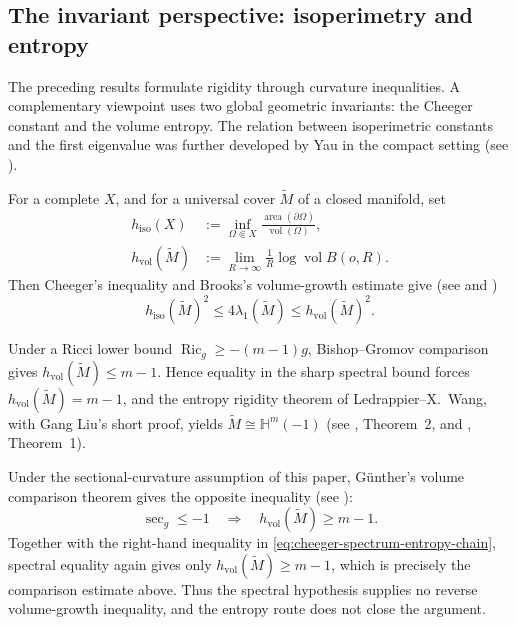 \documentclass[12pt]{amsart}
\theoremstyle{definition}
\numberwithin{equation}{section}
\newcommand{\wti}{\widetilde}
\newcommand{\bH}{\mathbb{H}}
\newcommand{\vol}{\operatorname{vol}}
\newcommand{\area}{\operatorname{area}}
\DeclareMathOperator{\Ric}{Ric}
\begin{document}
\subsection*{The invariant perspective: isoperimetry and entropy}

The preceding results formulate rigidity through curvature inequalities.
A complementary viewpoint uses two global geometric invariants: the
Cheeger constant and the volume entropy.
The relation between isoperimetric constants and the first eigenvalue was
further developed by Yau in the compact setting
(see \cite{Yau1975Isoperimetric}).

For a complete \(X\), and for a universal cover \(\wti M\) of a closed
manifold, set
\[
\begin{aligned}
  h_{\mathrm{iso}}(X)
  &:=
  \inf_{\Omega\Subset X}
  \frac{\area(\partial\Omega)}{\vol(\Omega)},\\
  h_{\mathrm{vol}}(\wti M)
  &:=
  \lim_{R\to\infty}\frac{1}{R}\log\vol B(o,R).
\end{aligned}
\]
Then Cheeger's inequality and Brooks's volume-growth
estimate give (see \cite{Cheeger1970} and \cite{Brooks1981})
\begin{equation}\label{eq:cheeger-spectrum-entropy-chain}
  h_{\mathrm{iso}}(\wti M)^2
  \leq 4\lambda_1(\wti M)
  \leq h_{\mathrm{vol}}(\wti M)^2.
\end{equation}

Under a Ricci lower bound \(\Ric_g\geq-(m-1)g\), Bishop--Gromov comparison
gives \(h_{\mathrm{vol}}(\wti M)\leq m-1\).  Hence equality in the sharp
spectral bound forces \(h_{\mathrm{vol}}(\wti M)=m-1\), and the entropy
rigidity theorem of Ledrappier--X.~Wang, with Gang Liu's short proof, yields
\(\wti M\cong\bH^m(-1)\)
(see \cite{LedrappierWang2010}, Theorem~2, and
\cite{Liu2011}, Theorem~1).

Under the sectional-curvature assumption of this paper, G\"unther's volume
comparison theorem gives the opposite inequality (see \cite{Gunther1960}):
\[
  \sec_g\leq-1
  \quad\Longrightarrow\quad
  h_{\mathrm{vol}}(\wti M)\geq m-1.
\]
Together with the right-hand inequality in
\eqref{eq:cheeger-spectrum-entropy-chain}, spectral equality again gives
only \(h_{\mathrm{vol}}(\wti M)\geq m-1\), which is precisely the
comparison estimate above.  Thus the spectral hypothesis supplies no
reverse volume-growth inequality, and the entropy route does not close
the argument.
\end{document}
